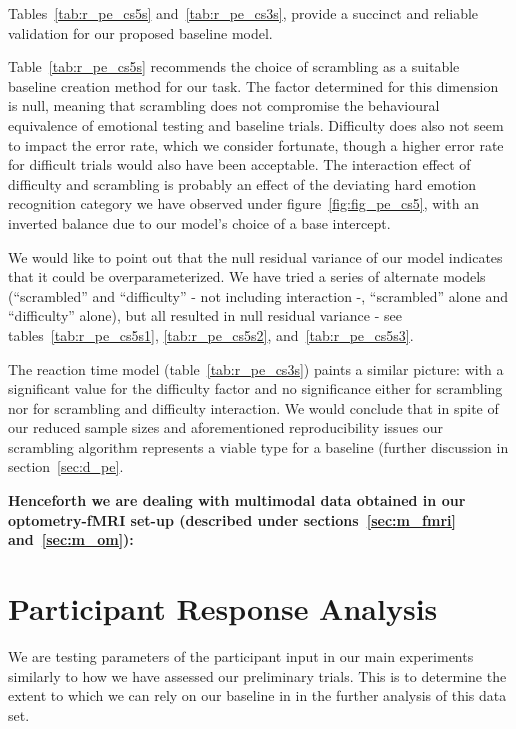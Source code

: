 	    Tables~\ref{tab:r_pe_cs5s} and~\ref{tab:r_pe_cs3s}, provide a succinct and reliable validation for our proposed baseline model.
	    
	    Table~\ref{tab:r_pe_cs5s} recommends the choice of scrambling as a suitable baseline creation method for our task.
	    The factor determined for this dimension is null, meaning that scrambling does not compromise the behavioural equivalence of emotional testing and baseline trials.
	    Difficulty does also not seem to impact the error rate, which we consider fortunate, though a higher error rate for difficult trials would also have been acceptable.
	    The interaction effect of difficulty and scrambling is probably an effect of the deviating hard emotion recognition category we have observed under figure~\ref{fig:fig_pe_cs5}, with an inverted balance due to our model's choice of a base intercept.
	    
	    We would like to point out that the null residual variance of our model indicates that it could be overparameterized.
	    We have tried a series of alternate models (“scrambled” and “difficulty” - not including interaction -, “scrambled” alone and “difficulty” alone), but all resulted in null residual variance - 
	    see tables~\ref{tab:r_pe_cs5s1}, \ref{tab:r_pe_cs5s2}, and~\ref{tab:r_pe_cs5s3}.
	    
	    The reaction time model (table~\ref{tab:r_pe_cs3s}) paints a similar picture: with a significant value for the difficulty factor and no significance either for scrambling nor for scrambling and difficulty interaction.
	    We would conclude that in spite of our reduced sample sizes and aforementioned reproducibility issues our scrambling algorithm represents a viable type for a baseline (further discussion in section~\ref{sec:d_pe}.
    \vspace{0.2cm}
    \begin{center}
    \textbf{Henceforth we are dealing with multimodal data obtained in our optometry-fMRI set-up (described under sections~\ref{sec:m_fmri} and~\ref{sec:m_om}):}
    \end{center}
    
    \section{Participant Response Analysis}\label{sec:r_ra}
	We are testing parameters of the participant input in our main experiments similarly to how we have assessed our preliminary trials.
	This is to determine the extent to which we can rely on our baseline in in the further analysis of this data set.

